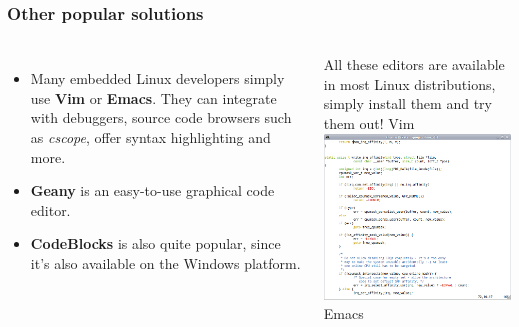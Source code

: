 \begin{frame}
  \frametitle{Other popular solutions}
  \begin{columns}[T]
    \begin{itemize}
    \item Many embedded Linux developers simply use {\bf Vim} or {\bf
        Emacs}. They can integrate with debuggers, source code browsers
      such as {\em cscope}, offer syntax highlighting and more.
    \item {\bf Geany} is an easy-to-use graphical code editor.
    \item {\bf CodeBlocks} is also quite popular, since it's also
      available on the Windows platform.
    \end{itemize}
    All these editors are available in most Linux distributions, simply
    install them and try them out!
    {\small Vim \\
    \includegraphics[height=0.38\textheight]{slides/sysdev-application-development/vim-screenshot.png}\\
    Emacs \\
}
\end{columns}
\end{frame}
